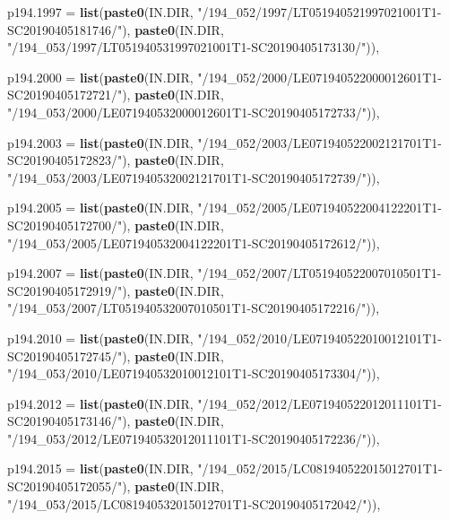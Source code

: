 \documentclass[a4paper, notitlepage, 12pt, krantz2]{krantz}
\newenvironment{Shaded}{\begin{snugshade}}{\end{snugshade}}
\newcommand{\DataTypeTok}[1]{\textcolor[rgb]{0.13,0.29,0.53}{#1}}
\newcommand{\KeywordTok}[1]{\textcolor[rgb]{0.13,0.29,0.53}{\textbf{#1}}}
\newcommand{\NormalTok}[1]{#1}
\newcommand{\StringTok}[1]{\textcolor[rgb]{0.31,0.60,0.02}{#1}}
\begin{document}
\begin{Shaded}
\begin{Highlighting}[]
  \DataTypeTok{p194.1997 =} \KeywordTok{list}\NormalTok{(}\KeywordTok{paste0}\NormalTok{(IN.DIR, }\StringTok{"/194_052/1997/LT051940521997021001T1-SC20190405181746/"}\NormalTok{),}
                   \KeywordTok{paste0}\NormalTok{(IN.DIR, }\StringTok{"/194_053/1997/LT051940531997021001T1-SC20190405173130/"}\NormalTok{)),}

  \DataTypeTok{p194.2000 =} \KeywordTok{list}\NormalTok{(}\KeywordTok{paste0}\NormalTok{(IN.DIR, }\StringTok{"/194_052/2000/LE071940522000012601T1-SC20190405172721/"}\NormalTok{),}
                   \KeywordTok{paste0}\NormalTok{(IN.DIR, }\StringTok{"/194_053/2000/LE071940532000012601T1-SC20190405172733/"}\NormalTok{)),}

  \DataTypeTok{p194.2003 =} \KeywordTok{list}\NormalTok{(}\KeywordTok{paste0}\NormalTok{(IN.DIR, }\StringTok{"/194_052/2003/LE071940522002121701T1-SC20190405172823/"}\NormalTok{),}
                   \KeywordTok{paste0}\NormalTok{(IN.DIR, }\StringTok{"/194_053/2003/LE071940532002121701T1-SC20190405172739/"}\NormalTok{)),}

  \DataTypeTok{p194.2005 =} \KeywordTok{list}\NormalTok{(}\KeywordTok{paste0}\NormalTok{(IN.DIR, }\StringTok{"/194_052/2005/LE071940522004122201T1-SC20190405172700/"}\NormalTok{),}
                   \KeywordTok{paste0}\NormalTok{(IN.DIR, }\StringTok{"/194_053/2005/LE071940532004122201T1-SC20190405172612/"}\NormalTok{)),}

  \DataTypeTok{p194.2007 =} \KeywordTok{list}\NormalTok{(}\KeywordTok{paste0}\NormalTok{(IN.DIR, }\StringTok{"/194_052/2007/LT051940522007010501T1-SC20190405172919/"}\NormalTok{),}
                   \KeywordTok{paste0}\NormalTok{(IN.DIR, }\StringTok{"/194_053/2007/LT051940532007010501T1-SC20190405172216/"}\NormalTok{)),}

  \DataTypeTok{p194.2010 =} \KeywordTok{list}\NormalTok{(}\KeywordTok{paste0}\NormalTok{(IN.DIR, }\StringTok{"/194_052/2010/LE071940522010012101T1-SC20190405172745/"}\NormalTok{),}
                   \KeywordTok{paste0}\NormalTok{(IN.DIR, }\StringTok{"/194_053/2010/LE071940532010012101T1-SC20190405173304/"}\NormalTok{)),}
  
  \DataTypeTok{p194.2012 =} \KeywordTok{list}\NormalTok{(}\KeywordTok{paste0}\NormalTok{(IN.DIR, }\StringTok{"/194_052/2012/LE071940522012011101T1-SC20190405173146/"}\NormalTok{),}
                   \KeywordTok{paste0}\NormalTok{(IN.DIR, }\StringTok{"/194_053/2012/LE071940532012011101T1-SC20190405172236/"}\NormalTok{)),}

  \DataTypeTok{p194.2015 =} \KeywordTok{list}\NormalTok{(}\KeywordTok{paste0}\NormalTok{(IN.DIR, }\StringTok{"/194_052/2015/LC081940522015012701T1-SC20190405172055/"}\NormalTok{),}
                   \KeywordTok{paste0}\NormalTok{(IN.DIR, }\StringTok{"/194_053/2015/LC081940532015012701T1-SC20190405172042/"}\NormalTok{)),}


\end{Highlighting}
\end{Shaded}
\end{document}
